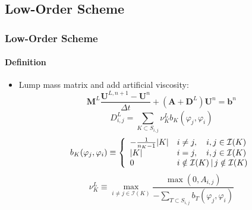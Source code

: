 \documentclass{beamer}
\renewcommand{\ij}{_{i,j}}
\newcommand{\U}{\mathbf{U}}
\newcommand{\M}{\mathbf{M}}
\newcommand{\A}{\mathbf{A}}
\newcommand{\D}{\mathbf{D}}
\renewcommand{\b}{\mathbf{b}}
\newcommand{\dt}{\Delta t}
\begin{document}
\subsection{Low-Order Scheme}
\begin{frame}
\frametitle{Low-Order Scheme}
\framesubtitle{Definition}

\begin{itemize}
   \item Lump mass matrix and add artificial viscosity:
   \begin{equation}\label{eq:loworderscheme}
      \M^L\frac{\U^{L,n+1}-\U^n}{\dt} + (\A + \D^L)\U^n = \b^n
   \end{equation}
   \begin{equation}\label{eq:loworderD}
      D\ij^L = \sum\limits_{K\subset S\ij}\nu_K^L b_K(\varphi_j,\varphi_i)
   \end{equation}
   \begin{equation}\label{eq:bilinearform}
      b_K(\varphi_j, \varphi_i) \equiv \left\{\begin{array}{l l}
         -\frac{1}{n_K - 1}|K| & i\ne j, \quad i,j\in \mathcal{I}(K)\\
         |K|                   & i = j,  \quad i,j\in \mathcal{I}(K)\\
         0                     & i\notin\mathcal{I}(K)\,|\, j\notin\mathcal{I}(K)
      \end{array}\right.
   \end{equation}
   \begin{equation}
      \nu_K^L \equiv \max\limits_{i\ne j\in \mathcal{I}(K)}\frac{\max(0,A\ij)}
      {-\sum\limits_{T\subset S\ij} b_T(\varphi_j, \varphi_i)}
   \end{equation}
\end{itemize}

\end{frame}
\end{document}
